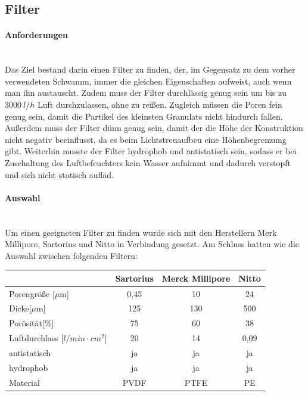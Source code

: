 \subsection{Filter}

\paragraph{Anforderungen}
\hfill \\
Das Ziel bestand darin einen Filter zu finden, der, im Gegensatz zu dem vorher verwendeten Schwamm, immer die gleichen Eigenschaften aufweist, auch wenn man ihn austauscht. Zudem muss der Filter durchlässig genug sein um bis zu $\SI{3000}{l/h}$ Luft durchzulassen, ohne zu reißen. Zugleich müssen die Poren fein genug sein, damit die Partikel des kleinsten Granulats nicht hindurch fallen. Außerdem muss der Filter dünn genug sein, damit der die Höhe der Konstruktion nicht negativ beeinflusst, da es beim Lichtstreuaufbeu eine Höhenbegrenzung gibt. Weiterhin musste der Filter hydrophob und antistatisch sein, sodass er bei Zuschaltung des Luftbefeuchters kein Wasser aufnimmt und dadurch verstopft und sich nicht statisch aufläd.


\paragraph{Auswahl}
\hfill \\
Um einen geeigneten Filter zu finden wurde sich mit den Herstellern Merk Millipore, Sartorius und Nitto in Verbindung gesetzt. Am Schluss hatten wie die Auswahl zwischen folgenden Filtern:


\begin{center}
			\begin{tabular}{l|c|c|c}
				& Sartorius & Merck Millipore & Nitto \\
				\hline
				Porengröße [$\mu$m] & 0,45  & 10    & 24 \\
				Dicke[$\mu$m] & 125 & 130 & 500 \\
				Porösität[$\%$] & 75    & 60    & 38 \\
				Luftdurchlass [$l/min \cdot cm^2$] & 20    & 14    & 0,09 \\
				antistatisch & ja    & ja    & ja \\
				hydrophob & ja    & ja    & ja \\
				Material & PVDF\footnotemark[1]  & PTFE\footnotemark[2]  & PE\footnotemark[3] \\
			\end{tabular}	
\end{center}

